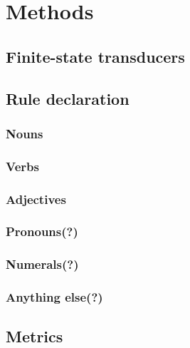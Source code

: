 \section{Methods}

\subsection{Finite-state transducers}

\subsection{Rule declaration }
\subsubsection{Nouns}
\subsubsection{Verbs}
\subsubsection{Adjectives}
\subsubsection{Pronouns(?)}
\subsubsection{Numerals(?)}
\subsubsection{Anything else(?)}

\subsection{Metrics}